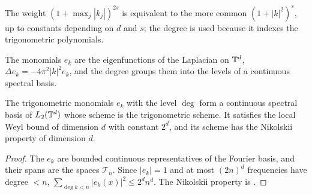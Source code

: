 The weight $(1 + \max_j |k_j|)^{2s}$ is equivalent to the more common $(1 + |k|^2)^s$, up to
constants depending on $d$ and $s$; the degree is used because it indexes the trigonometric
polynomials.

The monomials $e_k$ are the eigenfunctions of the Laplacian on $\mathbb{T}^d$,
$\Delta e_k = -4\pi^2 |k|^2 e_k$, and the degree groups them into the levels of a continuous
spectral basis.

\begin{proposition}
\label{prop:fourier-eigenbasis}
\leanok
{}
The trigonometric monomials $e_k$ with the level $\deg$ form a continuous spectral basis of
$L_2(\mathbb{T}^d)$ whose scheme is the trigonometric scheme. It satisfies the local Weyl bound of
dimension $d$ with constant $2^d$, and its scheme has the Nikolskii property of dimension $d$.
\end{proposition}

\begin{proof}
\leanok
The $e_k$ are bounded continuous representatives of the Fourier basis, and their spans are the
spaces $\mathcal{T}_n$. Since $|e_k| = 1$ and at most $(2n)^d$ frequencies have degree $< n$,
$\sum_{\deg k < n} |e_k(x)|^2 \leq 2^d n^d$. The Nikolskii property is .
\end{proof}

